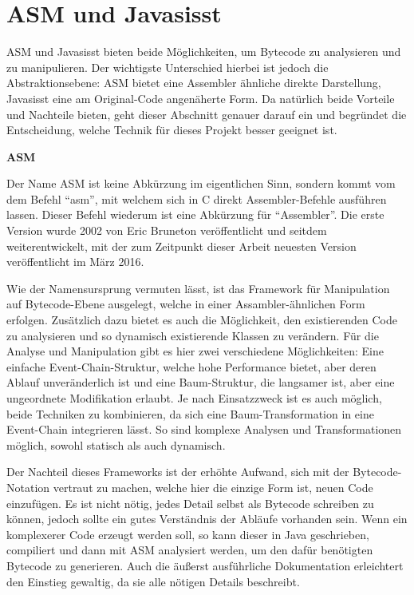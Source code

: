 \section{ASM und Javasisst} 

ASM und Javasisst bieten beide Möglichkeiten, um Bytecode zu analysieren und zu manipulieren. Der wichtigste Unterschied hierbei ist jedoch die Abstraktionsebene: ASM bietet eine Assembler ähnliche direkte Darstellung, Javasisst eine am Original-Code angenäherte Form. Da natürlich beide Vorteile und Nachteile bieten, geht dieser Abschnitt genauer darauf ein und begründet die Entscheidung, welche Technik für dieses Projekt besser geeignet ist.

\textbf{ASM}

Der Name ASM ist keine Abkürzung im eigentlichen Sinn, sondern kommt vom dem Befehl "`asm"', mit welchem sich in C direkt Assembler-Befehle ausführen lassen. Dieser Befehl wiederum ist eine Abkürzung für "`Assembler"'. Die erste Version wurde 2002 von Eric Bruneton veröffentlicht und seitdem weiterentwickelt, mit der zum Zeitpunkt dieser Arbeit neuesten Version veröffentlicht im März 2016.

Wie der Namensursprung vermuten lässt, ist das Framework für Manipulation auf Bytecode-Ebene ausgelegt, welche in einer Assambler-ähnlichen Form erfolgen. Zusätzlich dazu bietet es auch die Möglichkeit, den existierenden Code zu analysieren und so dynamisch existierende Klassen zu verändern. Für die Analyse und Manipulation gibt es hier zwei verschiedene Möglichkeiten: Eine einfache Event-Chain-Struktur, welche hohe Performance bietet, aber deren Ablauf unveränderlich ist und eine Baum-Struktur, die langsamer ist, aber eine ungeordnete Modifikation erlaubt.
Je nach Einsatzzweck ist es auch möglich, beide Techniken zu kombinieren, da sich eine Baum-Transformation in eine Event-Chain integrieren lässt. So sind komplexe Analysen und Transformationen möglich, sowohl statisch als auch dynamisch.

Der Nachteil dieses Frameworks ist der erhöhte Aufwand, sich mit der Bytecode-Notation vertraut zu machen, welche hier die einzige Form ist, neuen Code einzufügen. Es ist nicht nötig, jedes Detail selbst als Bytecode schreiben zu können, jedoch sollte ein gutes Verständnis der Abläufe vorhanden sein. Wenn ein komplexerer Code erzeugt werden soll, so kann dieser in Java geschrieben, compiliert und dann mit ASM analysiert werden, um den dafür benötigten Bytecode zu generieren. Auch die äußerst ausführliche Dokumentation erleichtert den Einstieg gewaltig, da sie alle nötigen Details beschreibt.


